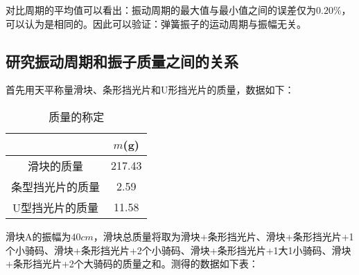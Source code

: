 \documentclass[11pt]{article}
\begin{document}
对比周期的平均值可以看出：振动周期的最大值与最小值之间的误差仅为$0.20 \%$，可以认为是相同的。因此可以验证：弹簧振子的运动周期与振幅无关。

\subsection{研究振动周期和振子质量之间的关系}

首先用天平称量滑块、条形挡光片和U形挡光片的质量，数据如下：

\begin{table}[H]
    \centering
    \caption{质量的称定}
    \begin{tabular}{|c|c|}
    \hline
        & $m$(g) \\ 
        \hline
        滑块的质量 & 217.43 \\ 
        \hline
        条型挡光片的质量 & 2.59 \\ 
        \hline
        U型挡光片的质量 & 11.58 \\ 
        \hline
    \end{tabular}
\end{table}

滑块A的振幅为$40cm$，滑块总质量将取为滑块+条形挡光片、滑块+条形挡光片+1个小骑码、滑块+条形挡光片+2个小骑码、滑块+条形挡光片+1大1小骑码、滑块+条形挡光片+2个大骑码的质量之和。测得的数据如下表：
\end{document}
